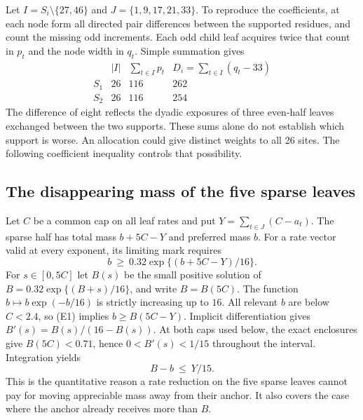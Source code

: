 Let \(I=S_i\setminus\{27,46\}\) and \(J=\{1,9,17,21,33\}\). To reproduce the coefficients, at each node form all directed pair differences between the supported residues, and count the missing odd increments. Each odd child leaf acquires twice that count in \(p_t\) and the node width in \(q_t\). Simple summation gives
\[
 \begin{array}{c|c|c|c}
 & |I| & \sum_{t\in I}p_t & D_i=\sum_{t\in I}(q_t-33)\\ \hline
 S_1&26&116&262\\
 S_2&26&116&254
 \end{array}
\]
The difference of eight reflects the dyadic exposures of three even-half leaves exchanged between the two supports. These sums alone do not establish which support is worse. An allocation could give distinct weights to all 26 sites. The following coefficient inequality controls that possibility.

\subsection{The disappearing mass of the five sparse leaves}

Let \(C\) be a common cap on all leaf rates and put \(Y=\sum_{t\in J}(C-a_t)\). The sparse half has total mass \(b+5C-Y\) and preferred mass \(b\). For a rate vector valid at every exponent, its limiting mark requires
\[
 b\ \ge\ 0.32\exp\{(b+5C-Y)/16\}.
 \tag{E1}
\]
For \(s\in[0,5C]\) let \(B(s)\) be the small positive solution of \(B=0.32\exp\{(B+s)/16\}\), and write \(B=B(5C)\). The function \(b\mapsto b\exp(-b/16)\) is strictly increasing up to \(16\). All relevant \(b\) are below \(C<2.4\), so (E1) implies \(b\ge B(5C-Y)\). Implicit differentiation gives \(B'(s)=B(s)/(16-B(s))\). At both caps used below, the exact enclosures give \(B(5C)<0.71\), hence \(0<B'(s)<1/15\) throughout the interval. Integration yields
\[
 B-b\ \le\ Y/15.
 \tag{E2}
\]
This is the quantitative reason a rate reduction on the five sparse leaves cannot pay for moving appreciable mass away from their anchor. It also covers the case where the anchor already receives more than \(B\).

